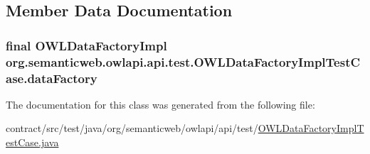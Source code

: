 \subsection{Member Data Documentation}
\hypertarget{classorg_1_1semanticweb_1_1owlapi_1_1api_1_1test_1_1_o_w_l_data_factory_impl_test_case_a8b5ffc5ba7c8e73e8628919047210c13}{
\subsubsection[{data\-Factory}]{\setlength{\rightskip}{0pt plus 5cm}final {\bf O\-W\-L\-Data\-Factory\-Impl} org.\-semanticweb.\-owlapi.\-api.\-test.\-O\-W\-L\-Data\-Factory\-Impl\-Test\-Case.\-data\-Factory\hspace{0.3cm}{\ttfamily [private]}}}\label{classorg_1_1semanticweb_1_1owlapi_1_1api_1_1test_1_1_o_w_l_data_factory_impl_test_case_a8b5ffc5ba7c8e73e8628919047210c13}


The documentation for this class was generated from the following file\-:\begin{DoxyCompactItemize}
\item 
contract/src/test/java/org/semanticweb/owlapi/api/test/\hyperlink{_o_w_l_data_factory_impl_test_case_8java}{O\-W\-L\-Data\-Factory\-Impl\-Test\-Case.\-java}\end{DoxyCompactItemize}
